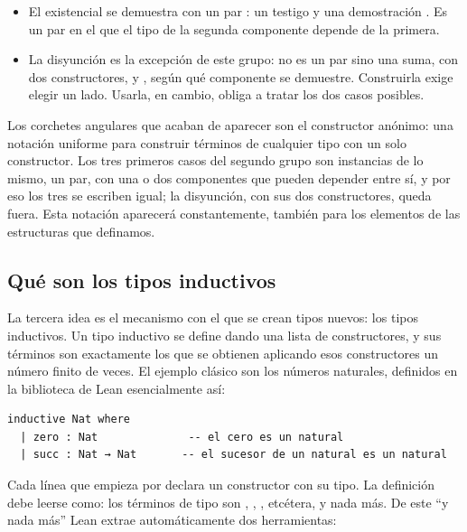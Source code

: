 \begin{itemize}
\begin{itemize}
          \item El existencial  se demuestra con un par : un testigo  y una demostración . Es un par en el que el tipo de la segunda componente depende de la primera.
          \item La disyunción  es la excepción de este grupo: no es un par sino una suma, con dos constructores,  y , según qué componente se demuestre. Construirla exige elegir un lado. Usarla, en cambio, obliga a tratar los dos casos posibles.
        \end{itemize}
\end{itemize}

Los corchetes angulares  que acaban de aparecer son el constructor anónimo: una notación uniforme para construir términos de cualquier tipo con un solo constructor. Los tres primeros casos del segundo grupo son instancias de lo mismo, un par, con una o dos componentes que pueden depender entre sí, y por eso los tres se escriben igual; la disyunción, con sus dos constructores, queda fuera. Esta notación aparecerá constantemente, también para los elementos de las estructuras que definamos.

\subsection{Qué son los tipos inductivos}\label{sec:tipos-inductivos}

La tercera idea es el mecanismo con el que se crean tipos nuevos: los tipos inductivos. Un tipo inductivo se define dando una lista de constructores, y sus términos son exactamente los que se obtienen aplicando esos constructores un número finito de veces. El ejemplo clásico son los números naturales, definidos en la biblioteca de Lean esencialmente así:

\begin{lstlisting}
inductive Nat where
  | zero : Nat              -- el cero es un natural
  | succ : Nat → Nat       -- el sucesor de un natural es un natural
\end{lstlisting}

Cada línea que empieza por \lean{|} declara un constructor con su tipo. La definición debe leerse como: los términos de tipo  son , , , etcétera, y nada más. De este ``y nada más'' Lean extrae automáticamente dos herramientas:

